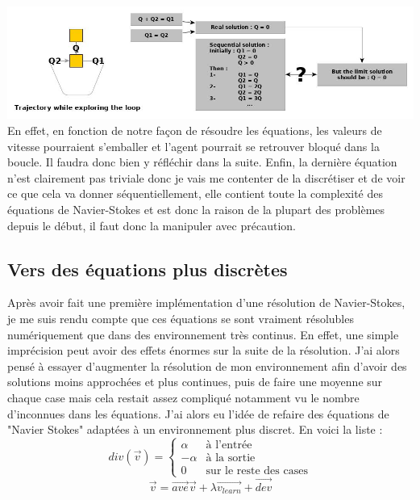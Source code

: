 \documentclass[10pt]{article}
\begin{document}
\includegraphics[scale=0.45]{ex_div_diverge.jpg}\\
En effet, en fonction de notre façon de résoudre les équations, les valeurs de vitesse pourraient s'emballer et l'agent pourrait se retrouver bloqué dans la boucle. Il faudra donc bien y réfléchir dans la suite. Enfin, la dernière équation n'est clairement pas triviale donc je vais me contenter de la discrétiser et de voir ce que cela va donner séquentiellement, elle contient toute la complexité des équations de Navier-Stokes et est donc la raison de la plupart des problèmes depuis le début, il faut donc la manipuler avec précaution.

\subsection{Vers des équations plus discrètes}
Après avoir fait une première implémentation d'une résolution de Navier-Stokes, je me suis rendu compte que ces équations se sont vraiment résolubles numériquement que dans des environnement très continus. En effet, une simple imprécision peut avoir des effets énormes sur la suite de la résolution. J'ai alors pensé à essayer d'augmenter la résolution de mon environnement afin d'avoir des solutions moins approchées et plus continues, puis de faire une moyenne sur chaque case mais cela restait assez compliqué notamment vu le nombre d'inconnues dans les équations.
J'ai alors eu l'idée de refaire des équations de "Navier Stokes" adaptées à un environnement plus discret. En voici la liste :
\[ div(\overrightarrow{v}) =
\begin{cases}
	\alpha & \text{à l'entrée} \\
	-\alpha & \text{à la sortie} \\
	0 & \text{sur le reste des cases}
\end{cases}
\] 
\[ \overrightarrow{v} = \overrightarrow{ave}\overrightarrow{v} +\lambda\overrightarrow{v_{learn}} +\overrightarrow{dev}\]
\end{document}
